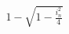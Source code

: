 \documentclass[preview]{standalone}
\begin{document}
\begin{align*}
1 - \sqrt{1 - \frac{i_n^2}{4}}
\end{align*}
\end{document}
